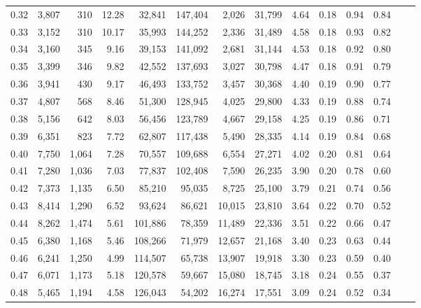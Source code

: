 \begin{tabular}{rrrrrrrrrrrrrr}
0.32 &  3,807 &    310 &   12.28 &   32,841 &  147,404 &   2,026 &  31,799 &  4.64 &  0.18 &  0.94 &      0.84 \\
0.33 &  3,152 &    310 &   10.17 &   35,993 &  144,252 &   2,336 &  31,489 &  4.58 &  0.18 &  0.93 &      0.82 \\
0.34 &  3,160 &    345 &    9.16 &   39,153 &  141,092 &   2,681 &  31,144 &  4.53 &  0.18 &  0.92 &      0.80 \\
0.35 &  3,399 &    346 &    9.82 &   42,552 &  137,693 &   3,027 &  30,798 &  4.47 &  0.18 &  0.91 &      0.79 \\
0.36 &  3,941 &    430 &    9.17 &   46,493 &  133,752 &   3,457 &  30,368 &  4.40 &  0.19 &  0.90 &      0.77 \\
0.37 &  4,807 &    568 &    8.46 &   51,300 &  128,945 &   4,025 &  29,800 &  4.33 &  0.19 &  0.88 &      0.74 \\
0.38 &  5,156 &    642 &    8.03 &   56,456 &  123,789 &   4,667 &  29,158 &  4.25 &  0.19 &  0.86 &      0.71 \\
0.39 &  6,351 &    823 &    7.72 &   62,807 &  117,438 &   5,490 &  28,335 &  4.14 &  0.19 &  0.84 &      0.68 \\
0.40 &  7,750 &  1,064 &    7.28 &   70,557 &  109,688 &   6,554 &  27,271 &  4.02 &  0.20 &  0.81 &      0.64 \\
0.41 &  7,280 &  1,036 &    7.03 &   77,837 &  102,408 &   7,590 &  26,235 &  3.90 &  0.20 &  0.78 &      0.60 \\
0.42 &  7,373 &  1,135 &    6.50 &   85,210 &   95,035 &   8,725 &  25,100 &  3.79 &  0.21 &  0.74 &      0.56 \\
0.43 &  8,414 &  1,290 &    6.52 &   93,624 &   86,621 &  10,015 &  23,810 &  3.64 &  0.22 &  0.70 &      0.52 \\
0.44 &  8,262 &  1,474 &    5.61 &  101,886 &   78,359 &  11,489 &  22,336 &  3.51 &  0.22 &  0.66 &      0.47 \\
0.45 &  6,380 &  1,168 &    5.46 &  108,266 &   71,979 &  12,657 &  21,168 &  3.40 &  0.23 &  0.63 &      0.44 \\
0.46 &  6,241 &  1,250 &    4.99 &  114,507 &   65,738 &  13,907 &  19,918 &  3.30 &  0.23 &  0.59 &      0.40 \\
0.47 &  6,071 &  1,173 &    5.18 &  120,578 &   59,667 &  15,080 &  18,745 &  3.18 &  0.24 &  0.55 &      0.37 \\
0.48 &  5,465 &  1,194 &    4.58 &  126,043 &   54,202 &  16,274 &  17,551 &  3.09 &  0.24 &  0.52 &      0.34 \\

\end{tabular}
